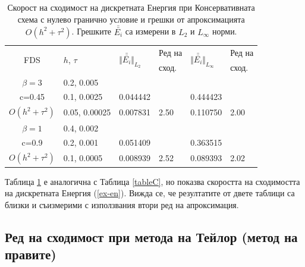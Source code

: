 \documentclass{article}
\newcommand{\rf}[1]{(\ref{#1})}
\begin{document}
\begin{table}[ht]
\centering
\small
		\begin{tabular}{||c|l|ll|ll||}
			\hline
			\hline
      \multirow{2  }{*}{FDS}        & \multirow{2  }{*}{$h$, $\tau$}  &  	\multirow{2  }{*}{ $\Vert \bar{\bar{ E_i}} \Vert_{L_2}$ }	&Ред на	& \multirow{2  }{*}{ $\Vert \bar{\bar{ E_i}} \Vert_{L_\infty}$ } 		&Ред на   \\
	                                        &                                                & 							 					&  сход. 	& 								       					& сход. \\
   			\hline 
					\hline 
  $\beta=3$                &0.2, 0.005         &                    &                &                  &                   \\
   c=0.45                     &0.1, 0.0025         & 0.044442   &                & 0.444423  &                   \\
     $O(h^2 + \tau^ 2)$ &0.05, 0.00025  & 0.007831   & 2.50       & 0.110750  & 2.00   \\
	   \hline
			\hline 
       $\beta=1$           & 0.4, 0.002       &                   &           &                 &   \\
                  c=0.9       & 0.2, 0.001        & 0.051409   &          &0.363515  &   \\
  $O(h^2+ \tau^2)$  & 0.1, 0.0005       & 0.008939   & 2.52  &0.089393  & 2.02  \\
	   \hline
			\hline 
		\end{tabular}
		\caption{Скорост на сходимост на дискретната Енергия при Консервативната схема с нулево гранично условие и грешки от апроксимацията $O(h^{2} + \tau^2 )$. Грешките $\bar{\bar{ E_i}}$ са измерени в $L_2$ и $L_\infty$ норми.}
\label{tableD}
\end{table}

Таблица \ref{tableD} е аналогична с Таблица \ref{tableC}, но показва скоростта на сходимостта на дискретната Енергия \rf{ex-en}. Вижда се, че резултатите от двете таблици са близки и съизмерими с използвания втори ред на апроксимация.

\subsection{Ред на сходимост при метода на Тейлор (метод на правите)}
\end{document}
